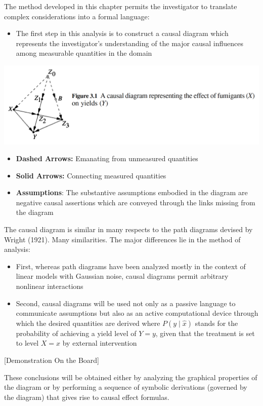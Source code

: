 \documentclass{beamer}
\begin{document}
\begin{frame}
The method developed in this chapter permits the investigator to translate complex considerations into a formal language:

\begin{itemize}
\item The first step in this analysis is to construct a causal diagram which represents the investigator's understanding of the major causal influences among measurable quantities in the domain
\end{itemize}
\vspace{0.3cm}
\includegraphics[scale=0.37]{img/fig_1}

\begin{itemize}
\item \textbf{Dashed Arrows:} Emanating from unmeasured quantities
\item \textbf{Solid Arrows:} Connecting measured quantities
\item \textbf{Assumptions}: The substantive assumptions embodied in the diagram are negative causal assertions which are conveyed through the links missing from the diagram
\end{itemize}
\end{frame}

\begin{frame}
The causal diagram is similar in many respects to the path diagrams devised by Wright (1921). Many similarities. The major differences lie in the method of analysis:
\begin{itemize}
\item First, whereas path diagrams have been analyzed mostly in the context of linear models with Gaussian noise, causal diagrams permit arbitrary nonlinear interactions
\item Second, causal diagrams will be used not only as a passive language to communicate assumptions but also as an active computational device through which the desired quantities are derived where $P(y \mid \hat{x})$ stands for the probability of achieving a yield level of $Y=y$, given that the treatment is set to level $X=x$ by external intervention
\end{itemize}

\begin{center}
[Demonstration On the Board]
\end{center}

These conclusions will be obtained either by analyzing the graphical properties of the diagram or by performing a sequence of symbolic derivations (governed by the diagram) that gives rise to causal effect formulas.
\end{frame}
\end{document}
